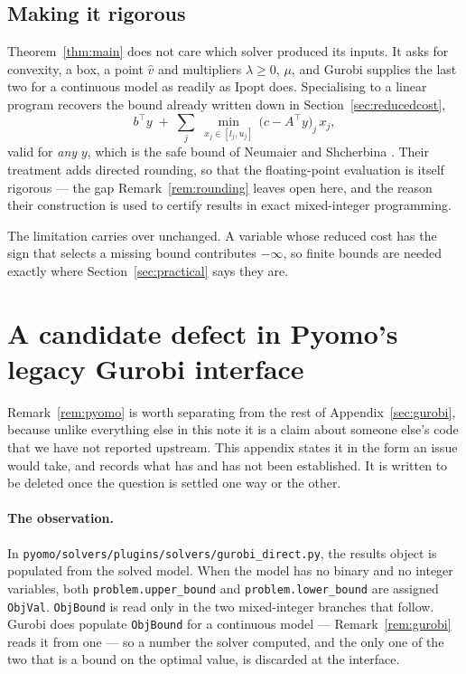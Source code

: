 \documentclass[11pt]{article}
\theoremstyle{plain}
\theoremstyle{remark}
\newcommand{\vhat}{\hat{v}}
\begin{document}
\subsection{Making it rigorous}

Theorem~\ref{thm:main} does not care which solver produced its inputs.  It asks
for convexity, a box, a point $\vhat$ and multipliers $\lambda \ge 0$, $\mu$,
and Gurobi supplies the last two for a continuous model as readily as Ipopt
does.  Specialising to a linear program recovers the bound already written down
in Section~\ref{sec:reducedcost},
\[
  b^{\top} y \;+\; \sum_j \; \min_{x_j \in [l_j, u_j]} \,
      \bigl( c - A^{\top} y \bigr)_j \, x_j ,
\]
valid for \emph{any} $y$, which is the safe bound of Neumaier and Shcherbina
\cite{neumaier2004}.  Their treatment adds directed rounding, so that the
floating-point evaluation is itself rigorous --- the gap
Remark~\ref{rem:rounding} leaves open here, and the reason their construction
is used to certify results in exact mixed-integer programming.

The limitation carries over unchanged.  A variable whose reduced cost has the
sign that selects a missing bound contributes $-\infty$, so finite bounds are
needed exactly where Section~\ref{sec:practical} says they are.

\section{A candidate defect in Pyomo's legacy Gurobi interface}
\label{sec:pyomoissue}

Remark~\ref{rem:pyomo} is worth separating from the rest of
Appendix~\ref{sec:gurobi}, because unlike everything else in this note it is a
claim about someone else's code that we have not reported upstream.  This
appendix states it in the form an issue would take, and records what has and
has not been established.  It is written to be deleted once the question is
settled one way or the other.

\paragraph{The observation.}
In \texttt{pyomo/solvers/plugins/solvers/gurobi\_direct.py}, the results object
is populated from the solved model.  When the model has no binary and no
integer variables, both \texttt{problem.upper\_bound} and
\texttt{problem.lower\_bound} are assigned \texttt{ObjVal}.  \texttt{ObjBound}
is read only in the two mixed-integer branches that follow.  Gurobi does
populate \texttt{ObjBound} for a continuous model --- Remark~\ref{rem:gurobi}
reads it from one --- so a number the solver computed, and the only one of the
two that is a bound on the optimal value, is discarded at the interface.
\end{document}
